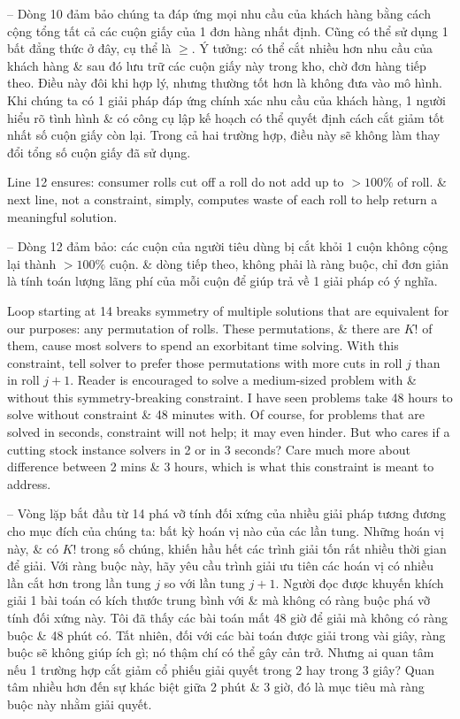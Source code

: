 \documentclass{article}
\begin{document}
\begin{itemize}
\begin{itemize}
\begin{itemize}
\begin{itemize}
                -- Dòng 10 đảm bảo chúng ta đáp ứng mọi nhu cầu của khách hàng bằng cách cộng tổng tất cả các cuộn giấy của 1 đơn hàng nhất định. Cũng có thể sử dụng 1 bất đẳng thức ở đây, cụ thể là $\ge$. Ý tưởng: có thể cắt nhiều hơn nhu cầu của khách hàng \& sau đó lưu trữ các cuộn giấy này trong kho, chờ đơn hàng tiếp theo. Điều này đôi khi hợp lý, nhưng thường tốt hơn là không đưa vào mô hình. Khi chúng ta có 1 giải pháp đáp ứng chính xác nhu cầu của khách hàng, 1 người hiểu rõ tình hình \& có công cụ lập kế hoạch có thể quyết định cách cắt giảm tốt nhất số cuộn giấy còn lại. Trong cả hai trường hợp, điều này sẽ không làm thay đổi tổng số cuộn giấy đã sử dụng.

                Line 12 ensures: consumer rolls cut off a roll do not add up to $> 100\%$ of roll. \& next line, not a constraint, simply, computes waste of each roll to help return a meaningful solution.

                -- Dòng 12 đảm bảo: các cuộn của người tiêu dùng bị cắt khỏi 1 cuộn không cộng lại thành $> 100\%$ cuộn. \& dòng tiếp theo, không phải là ràng buộc, chỉ đơn giản là tính toán lượng lãng phí của mỗi cuộn để giúp trả về 1 giải pháp có ý nghĩa.

                Loop starting at 14 breaks symmetry of multiple solutions that are equivalent for our purposes: any permutation of rolls. These permutations, \& there are $K!$ of them, cause most solvers to spend an exorbitant time solving. With this constraint, tell solver to prefer those permutations with more cuts in roll $j$ than in roll $j + 1$. Reader is encouraged to solve a medium-sized problem with \& without this symmetry-breaking constraint. I have seen problems take 48 hours to solve without constraint \& 48 minutes with. Of course, for problems that are solved in seconds, constraint will not help; it may even hinder. But who cares if a cutting stock instance solvers in 2 or in 3 seconds? Care much more about difference between 2 mins \& 3 hours, which is what this constraint is meant to address.

                -- Vòng lặp bắt đầu từ 14 phá vỡ tính đối xứng của nhiều giải pháp tương đương cho mục đích của chúng ta: bất kỳ hoán vị nào của các lần tung. Những hoán vị này, \& có $K!$ trong số chúng, khiến hầu hết các trình giải tốn rất nhiều thời gian để giải. Với ràng buộc này, hãy yêu cầu trình giải ưu tiên các hoán vị có nhiều lần cắt hơn trong lần tung $j$ so với lần tung $j + 1$. Người đọc được khuyến khích giải 1 bài toán có kích thước trung bình với \& mà không có ràng buộc phá vỡ tính đối xứng này. Tôi đã thấy các bài toán mất 48 giờ để giải mà không có ràng buộc \& 48 phút có. Tất nhiên, đối với các bài toán được giải trong vài giây, ràng buộc sẽ không giúp ích gì; nó thậm chí có thể gây cản trở. Nhưng ai quan tâm nếu 1 trường hợp cắt giảm cổ phiếu giải quyết trong 2 hay trong 3 giây? Quan tâm nhiều hơn đến sự khác biệt giữa 2 phút \& 3 giờ, đó là mục tiêu mà ràng buộc này nhằm giải quyết.


\end{itemize}
\end{itemize}
\end{itemize}
\end{itemize}
\end{document}
